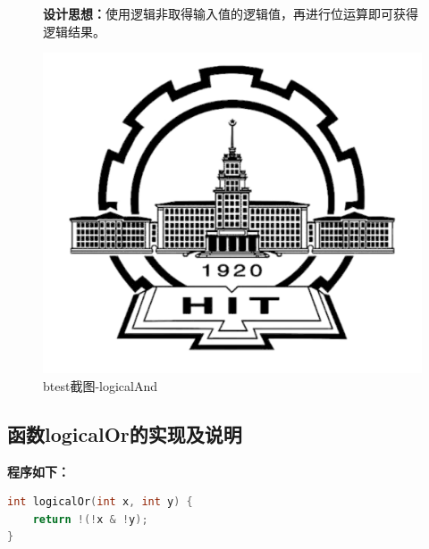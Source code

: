 \begin{figure}[H]
\begin{minipage}[c]{0.5\linewidth}
\textbf{设计思想：}使用逻辑非取得输入值的逻辑值，再进行位运算即可获得逻辑结果。
		
\end{minipage}
\begin{minipage}[c]{0.4\linewidth}
\centering
\includegraphics[width=0.9\linewidth]{figures/HIT}
\caption{btest截图-logicalAnd}
\label{fig:logicalAnd}
\end{minipage}
\end{figure}

\subsection{函数logicalOr的实现及说明}
\textbf{程序如下：}

\begin{lstlisting}[language = c]
int logicalOr(int x, int y) {
	return !(!x & !y);
}
\end{lstlisting}

